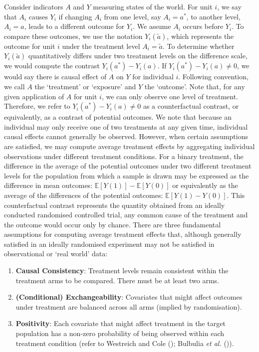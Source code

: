 \documentclass[
  single column]{article}
\providecommand{\tightlist}{%
  \setlength{\itemsep}{0pt}\setlength{\parskip}{0pt}}\usepackage{longtable,booktabs,array}
\begin{document}
Consider indicators \(A\) and \(Y\) measuring states of the world. For
unit \(i\), we say that \(A_i\) causes \(Y_i\) if changing \(A_i\) from
one level, say \(A_i = a^*\), to another level, \(A_i = a\), leads to a
different outcome for \(Y_i\). We assume \(A_i\) occurs before \(Y_i\).
To compare these outcomes, we use the notation \(Y_i(\tilde{a})\), which
represents the outcome for unit \(i\) under the treatment level
\(A_i = \tilde{a}\). To determine whether \(Y_i(\tilde{a})\)
quantitatively differs under two treatment levels on the difference
scale, we would compute the contrast \(Y_i(a^*) - Y_i(a)\). If
\(Y_i(a^*) - Y_i(a) \neq 0\), we would say there is causal effect of
\(A\) on \(Y\) for individual \(i\). Following convention, we call \(A\)
the `treatment' or `exposure' and \(Y\) the `outcome'. Note that, for
any given application of \(A\) for unit \(i\), we can only observe one
level of treatment. Therefore, we refer to \(Y_i(a^*) - Y_i(a) \neq 0\)
as a counterfactual contrast, or equivalently, as a contrast of
potential outcomes. We note that because an individual may only receive
one of two treatments at any given time, individual causal effects
cannot generally be observed. However, when certain assumptions are
satisfied, we may compute average treatment effects by aggregating
individual observations under different treatment conditions. For a
binary treatment, the difference in the average of the potential
outcomes under two different treatment levels for the population from
which a sample is drawn may be expressed as the difference in mean
outcomes: \(\mathbb{E}[Y(1)] - \mathbb{E}[Y(0)]\) or equivalently as the
average of the differences of the potential outcomes:
\(\mathbb{E}[Y(1) - Y(0)]\). This counterfactual contrast represents the
quantity obtained from an ideally conducted randomised controlled trial,
any common cause of the treatment and the outcome would occur only by
chance. There are three fundamental assumptions for computing average
treatment effects that, although generally satisfied in an ideally
randomised experiment may not be satisfied in observational or `real
world' data:

\begin{enumerate}
\def\labelenumi{\arabic{enumi}.}
\tightlist
\item
  \textbf{Causal Consistency}: Treatment levels remain consistent within
  the treatment arms to be compared. There must be at least two arms.
\item
  \textbf{(Conditional) Exchangeability}: Covariates that might affect
  outcomes under treatment are balanced across all arms (implied by
  randomisation).
\item
  \textbf{Positivity}: Each covariate that might affect treatment in the
  target population has a non-zero probability of being observed within
  each treatment condition (refer to Westreich and Cole
  (); Bulbulia \emph{et al.}
  ()).
\end{enumerate}
\end{document}
